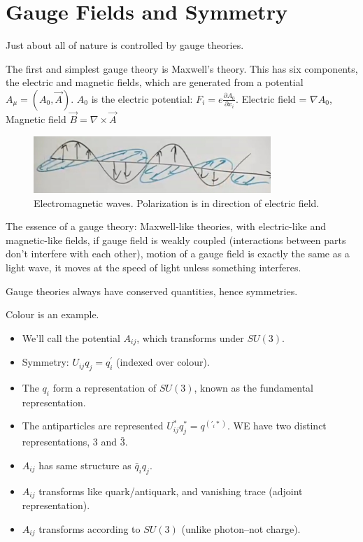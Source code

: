 \documentclass[]{article}
\begin{document}
\section{Gauge Fields and Symmetry}

Just about all of nature is controlled by gauge theories.

The first and simplest gauge theory is Maxwell's theory. This has six components, the electric and magnetic fields, which are generated from a potential $A_\mu=(A_0,\vec{A})$. $A_0$ is the electric potential: $F_i=e \frac{\partial A_0}{\partial x_i}$. Electric field = $\nabla A_0$, Magnetic field $\vec{B}=\nabla \times \vec{A}$

\begin{figure}[H]
	\caption[Electromagnetic waves, illustrating Polarization.]{Electromagnetic waves. Polarization is in direction of electric field.}
	\includegraphics[width=0.8\textwidth]{2-5-EM-field}
\end{figure}

The essence of a gauge theory: Maxwell-like theories, with electric-like and magnetic-like fields, if gauge field is weakly coupled (interactions between parts don't interfere with each other), motion of a gauge field is exactly the same as a light wave, it moves at the speed of light unless something interferes.

Gauge theories  always have conserved quantities, hence symmetries.

Colour is an example.
\begin{itemize}
	\item  We'll call the potential $A_{ij}$, which transforms under $SU(3)$.
	\item Symmetry: $U_{ij} q_j = q^\prime_i$ (indexed over colour).
	\item The $q_i$ form a representation of $SU(3)$, known as the fundamental representation.
	\item The antiparticles are represented $U^*_{ij} q^*_j = q^(\prime_i*)$. WE have two distinct representations, 3 and $\bar{3}$.
	\item  $A_{ij}$ has same structure as $\bar{q}_i q_j$.
	\item $A_{ij}$ transforms like quark/antiquark, and vanishing trace (adjoint representation).
	\item $A_{ij}$ transforms according to $SU(3)$  (unlike photon--not charge).
\end{itemize}
\end{document}
